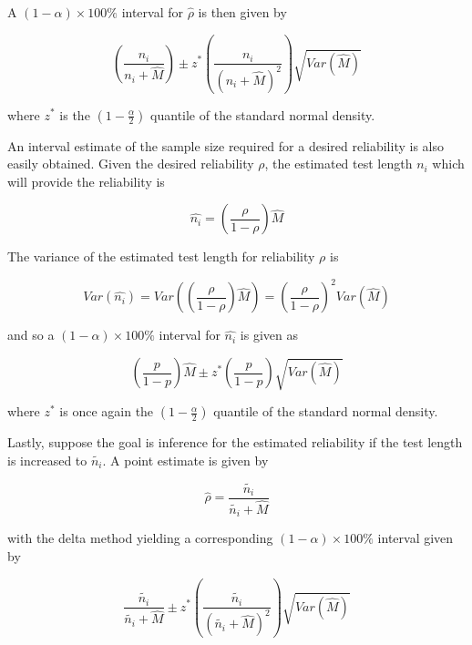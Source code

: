 \documentclass[12pt,epsfig]{article}
\begin{document}
\noindent A $(1 - \alpha) \times 100\%$ interval for $\hat{\rho}$ is then given by

\begin{equation}
    \left(\dfrac{n_i}{n_i + \hat{M}}\right) \pm z^* \left(\dfrac{n_i}{(n_i + \hat{M})^2}\right) \sqrt{Var(\hat{M})}
    \label{Eq:RhoInterval}
\end{equation}

\noindent where $z^*$ is the $(1 - \frac{\alpha}{2})$ quantile of the standard normal density.

An interval estimate of the sample size required for a desired reliability is also easily obtained. Given the desired reliability $\rho$, the estimated test length $n_i$ which will provide the reliability is


\begin{equation}
\hat{n_i} = \left(\dfrac{\rho}{1-\rho}\right)\hat{M}
\label{Eq:ProphecyPoint}
\end{equation}

\noindent The variance of the estimated test length for reliability $\rho$ is


\begin{equation*}
Var(\hat{n_i}) = Var\left( \left(\dfrac{\rho}{1-\rho}\right)\hat{M}\right) = \left(\dfrac{\rho}{1-\rho}\right)^2 Var(\hat{M})
\end{equation*}


\noindent and so a $(1-\alpha)\times 100\%$ interval for $\hat{n_i}$ is given as


\begin{equation}
\left(\dfrac{p}{1-p}\right)\hat{M} \pm z^* \left(\dfrac{p}{1-p}\right) \sqrt{Var(\hat{M})}
\label{Eq:ProphecyInterval}
\end{equation}

\noindent where $z^*$ is once again the $(1 - \frac{\alpha}{2})$ quantile of the standard normal density.

Lastly, suppose the goal is inference for the estimated reliability if the test length is increased to $\tilde{n_i}$. A point estimate is given by

\begin{equation}
    \hat{\rho} = \dfrac{\tilde{n_i}}{\tilde{n_i} + \hat{M}}
    \label{Eq:ReliabilityPoint}
\end{equation}

\noindent with the delta method yielding a corresponding $(1 - \alpha) \times 100\%$ interval given by

\begin{equation}
    \dfrac{\tilde{n_i}}{\tilde{n_i} + \hat{M}} \pm z^* \left(\dfrac{\tilde{n_i}}{(\tilde{n_i} + \hat{M})^2}\right) \sqrt{Var(\hat{M})}
    \label{Eq:ReliabilityInterval}
\end{equation}
\end{document}
